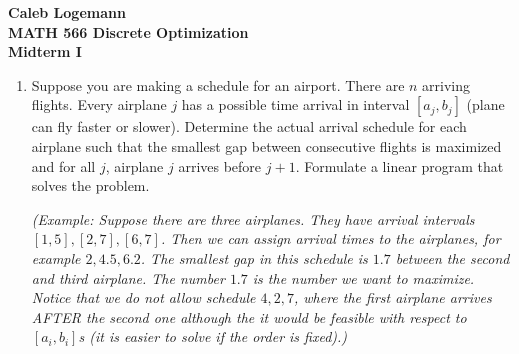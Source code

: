 \documentclass[11pt, oneside]{article}
\begin{document}
\noindent \textbf{\Large{Caleb Logemann \\
MATH 566 Discrete Optimization\\
Midterm I
}}

%
\begin{enumerate}
  \item %
    Suppose you are making a schedule for an airport.
    There are $n$ arriving flights.
    Every airplane $j$ has a possible time arrival  in interval $[a_j,b_j]$
    (plane can fly faster or slower). 
    Determine the actual arrival schedule for each airplane such that the
    smallest gap between consecutive flights is maximized
    and for all $j$, airplane $j$ arrives before $j+1$.
    Formulate a linear program that solves the problem.

    \emph{
      (Example: Suppose there are three airplanes. They have arrival intervals $[1,5],[2,7],[6,7]$.
      Then we can assign arrival times to the airplanes, for example $2,4.5,6.2$. The smallest
      gap in this schedule is $1.7$ between the second and third airplane. The number $1.7$
      is the number we want to maximize. Notice that we do not allow schedule $4,2,7$, where the first
      airplane arrives AFTER the second one although the it would be feasible with respect to $[a_i,b_i]$s
      (it is easier to solve if the order is fixed).)
    }


\end{enumerate}
\end{document}
